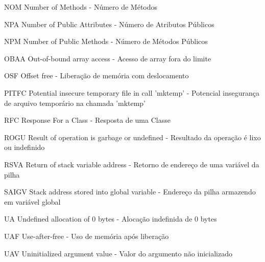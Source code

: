 \begin{siglas}
  \item[NOM] Number of Methods - Número de Métodos
  \item[NPA] Number of Public Attributes - Número de Atributos Públicos
  \item[NPM] Number of Public Methods - Número de Métodos Públicos
  \item[OBAA] Out-of-bound array access - Acesso de array fora do limite
  \item[OSF] Offset free - Liberação de memória com deslocamento
  \item[PITFC] Potential insecure temporary file in call 'mktemp' - Potencial insegurança de arquivo temporário na chamada 'mktemp'
  \item[RFC] Response For a Class - Resposta de uma Classe
  \item[ROGU] Result of operation is garbage or undefined - Resultado da operação é lixo ou indefinido
  \item[RSVA] Return of stack variable address - Retorno de endereço de uma variável da pilha
  \item[SAIGV] Stack address stored into global variable - Endereço da pilha armazendo em variável global
  \item[UA] Undefined allocation of 0 bytes - Alocação indefinida de 0 bytes
  \item[UAF] Use-after-free - Uso de memória após liberação
  \item[UAV] Uninitialized argument value - Valor do argumento não inicializado
\end{siglas}
